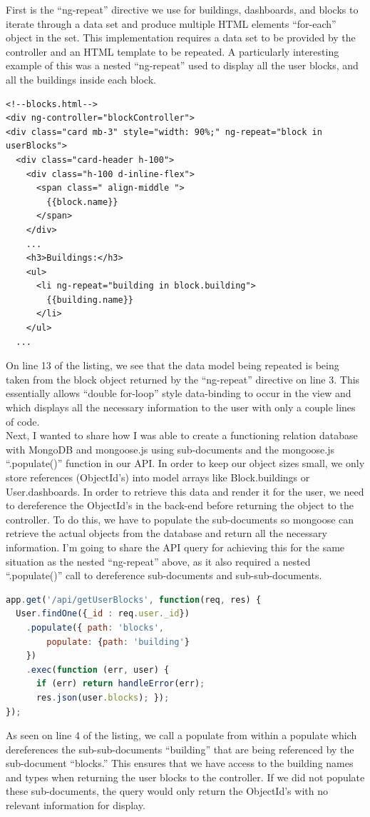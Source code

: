 \documentclass[letterpaper,10pt,serif,draftclsnofoot,onecolumn,compsoc,titlepage]{IEEEtran}
\begin{document}
\noindent First is the ``ng-repeat'' directive we use for buildings, dashboards, and blocks to iterate through a data set and produce multiple HTML elements ``for-each'' object in the set. This implementation requires a data set to be provided by the controller and an HTML template to be repeated. A particularly interesting example of this was a nested ``ng-repeat'' used to display all the user blocks, and all the buildings inside each block. 
\begin{lstlisting}[language=HTML5]
<!--blocks.html-->
<div ng-controller="blockController">
<div class="card mb-3" style="width: 90%;" ng-repeat="block in userBlocks">
  <div class="card-header h-100">
    <div class="h-100 d-inline-flex">
      <span class=" align-middle ">
        {{block.name}}
      </span>
    </div>
    ...
    <h3>Buildings:</h3>
    <ul>
      <li ng-repeat="building in block.building">
        {{building.name}}
      </li>
    </ul>
  ...
\end{lstlisting}
On line 13 of the listing, we see that the data model being repeated is being taken from the block object returned by the ``ng-repeat'' directive on line 3. This essentially allows ``double for-loop'' style data-binding to occur in the view and which displays all the necessary information to the user with only a couple lines of code.\\

\noindent Next, I wanted to share how I was able to create a functioning relation database with MongoDB and mongoose.js using sub-documents and the mongoose.js ``.populate()'' function in our API. In order to keep our object sizes small, we only store references (ObjectId's) into model arrays like Block.buildings or User.dashboards. In order to retrieve this data and render it for the user, we need to dereference the ObjectId's in the back-end before returning the object to the controller. To do this, we have to populate the sub-documents so mongoose can retrieve the actual objects from the database and return all the necessary information. I'm going to share the API query for achieving this for the same situation as the nested ``ng-repeat'' above, as it also required a nested ``.populate()'' call to dereference sub-documents and sub-sub-documents.
\begin{lstlisting}[language=JavaScript]
app.get('/api/getUserBlocks', function(req, res) {
  User.findOne({_id : req.user._id})
    .populate({ path: 'blocks',
        populate: {path: 'building'}
    })
    .exec(function (err, user) {
      if (err) return handleError(err);
      res.json(user.blocks); });
});
\end{lstlisting}
As seen on line 4 of the listing, we call a populate from within a populate which dereferences the sub-sub-documents ``building'' that are being referenced by the sub-document ``blocks.'' This ensures that we have access to the building names and types when returning the user blocks to the controller. If we did not populate these sub-documents, the query would only return the ObjectId's with no relevant information for display.\\
\noindent 
\end{document}
